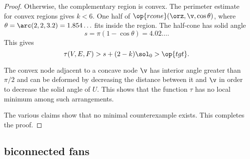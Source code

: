\begin{proof}
  Otherwise,
the complementary region is convex.  The perimeter estimate for convex
regions gives $k<6$.
%
One
half of $\op{rcone}(\orz,\v,\cos\theta)$, where
$\theta=\arc(2,2,3.2)=1.854\ldots$ fits inside the region.  The
half-cone has solid angle
\[
s=\pi(1-\cos\theta)=4.02\ldots.
\]
This gives
\[
\tau(V,E,F) > s + (2-k)\sol_0 > \op{tgt}.
\]
%




The convex node adjacent to a concave node $\v$ has interior angle greater
than $\pi/2$ and can be deformed by decreasing the distance between it
and $\v$ in order to decrease the solid angle of $U$.  This shows that the
function $\tau$ has no local minimum among such arrangements.
%
%

The various claims show that no minimal counterexample exists.  This
completes the proof.
\end{proof}

\subsection{biconnected fans}

